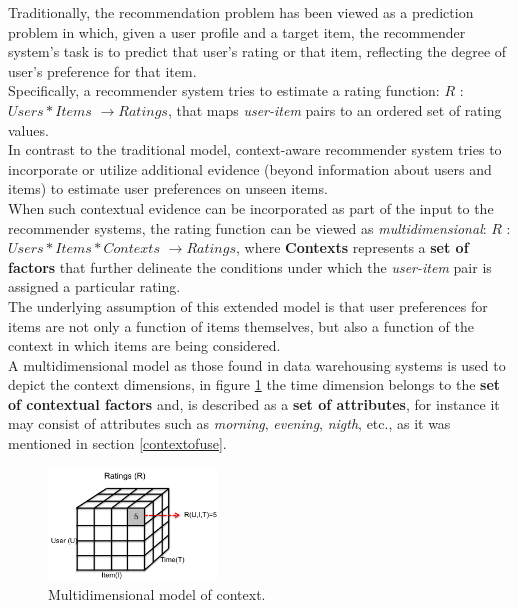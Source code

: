 Traditionally, the recommendation problem has been viewed as a
prediction problem in which, given a user profile and a target item,
the recommender system's task is to predict that user's rating or that
item, reflecting the degree of user's preference for that 
item\cite{jannach2010recommender}. \\
Specifically, a recommender system tries to estimate a rating
function: $R$ : $Users * Items$ $ \rightarrow Ratings$, that maps
\textit{user-item} pairs to an ordered  set of rating values.\\
In contrast to the traditional model, context-aware recommender system
tries to incorporate or utilize additional evidence (beyond
information about users and items) to estimate user preferences on
unseen items.\\ When such contextual evidence can be incorporated as
part of the input to the recommender systems, the rating function can
be viewed as \textit{multidimensional}: $R$ : $Users * Items *
Contexts$ $ \rightarrow Ratings$, where \textbf{Contexts} represents a
\textbf{set of factors} that further delineate the conditions under which the
\textit{user-item} pair is assigned a particular rating. \\ The
underlying assumption of this extended model is that user preferences
for items are not only a function of items themselves, but also a
function of the context in which items are being
considered\cite{lim2009assessing}. \\
A multidimensional model as those found in data warehousing systems\cite{kimball2011data} is
used to depict the context dimensions, in figure
\ref{fig:multidimension} the time dimension belongs to the \textbf{set of 
contextual factors} and, is described as a \textbf{set of
attributes}, for instance it may consist of
attributes such as \textit{morning}, \textit{evening},  \textit{nigth},
etc., as it was mentioned in section  \ref{contextofuse}. 
\begin{figure}
\captionsetup{font=footnotesize}
\centering
\includegraphics[width=0.40\textwidth]{img/multidimension.png}
\small
\caption{Multidimensional model of context.}
\label{fig:multidimension}   
\end{figure}

